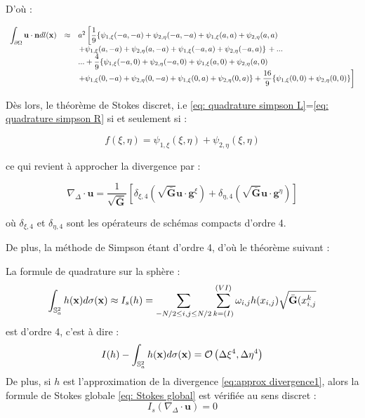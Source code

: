 D'où :

\begin{equation}
\begin{array}{rcl}
\displaystyle\int_{\partial \Omega} \mathbf{u} \cdot \mathbf{n} dl(\mathbf{x}) & \approx &  a^2 \left[ \dfrac{1}{9} \lbrace  \psi_{1,\xi}(-a,-a)+\psi_{2,\eta}(-a,-a)+\psi_{1,\xi}(a,a)+\psi_{2,\eta}(a,a) \right. \\
& & \left. +\psi_{1,\xi}(a,-a)+\psi_{2,\eta}(a,-a)+\psi_{1,\xi}(-a,a)+\psi_{2,\eta}(-a,a)  \rbrace \right. + ...\\
& & ...+ \dfrac{4}{9} \lbrace  \psi_{1,\xi}(-a,0)+\psi_{2,\eta}(-a,0)+\psi_{1,\xi}(a,0)+\psi_{2,\eta}(a,0) \\
& & \left. +\psi_{1,\xi}(0,-a)+\psi_{2,\eta}(0,-a)+\psi_{1,\xi}(0,a)+\psi_{2,\eta}(0,a)   \rbrace + \dfrac{16}{9} \lbrace \psi_{1,\xi}(0,0)+\psi_{2,\eta}(0,0) \rbrace \right]
\end{array}
\label{eq: quadrature simpson R}
\end{equation}

Dès lors, le théorème de Stokes discret, i.e \eqref{eq: quadrature simpson L}=\eqref{eq: quadrature simpson R} si et seulement si :

\begin{equation}
f(\xi,\eta) = \psi_{1,\xi}(\xi,\eta)+\psi_{2,\eta}(\xi,\eta)
\end{equation}

ce qui revient à approcher la divergence par :

\begin{equation}
\nabla_{\Delta} \cdot \mathbf{u} =\dfrac{1}{\sqrt{\bar{\mathbf{G}}}} \left[ \delta_{\xi,4} \left( \sqrt{\bar{\mathbf{G}}} \mathbf{u} \cdot \mathbf{g}^{\xi} \right) +\delta_{\eta,4} \left( \sqrt{\bar{\mathbf{G}}} \mathbf{u} \cdot \mathbf{g}^{\eta} \right)  \right]
\label{eq:approx divergence1}
\end{equation}

où $\delta_{\xi,4}$ et $\delta_{\eta,4}$ sont les opérateurs de schémas compacts d'ordre 4.

De plus, la méthode de Simpson étant d'ordre 4, d'où le théorème suivant :

\begin{theoreme}
La formule de quadrature sur la sphère :
\begin{equation}
\displaystyle\int_{\mathbb{S}_a^2} h(\mathbf{x}) d\sigma(\mathbf{x}) \approx I_s(h)=\sum_{-N/2 \leq i,j \leq N/2} \sum_{k=(I)}^{(VI)} \omega_{i,j} h(x_{i,j})\sqrt{\bar{\mathbf{G}}(x_{i,j}^k}
\label{eq:quadrature simpson}
\end{equation}
est d'ordre 4, c'est à dire :
\begin{equation}
I(h)- \displaystyle\int_{\mathbb{S}_a^2} h(\mathbf{x}) d\sigma(\mathbf{x}) = \mathcal{O}\left( \Delta \xi^4,\Delta \eta^4\right)
\end{equation}
De plus, si $h$ est l'approximation de la divergence \eqref{eq:approx divergence1}, alors la formule de Stokes globale \eqref{eq: Stokes global} est vérifiée au sens discret :
\begin{equation}
I_s(\nabla_{\Delta} \cdot \mathbf{u}) = 0
\label{eq: Stokes global I_s}
\end{equation}
\end{theoreme}

